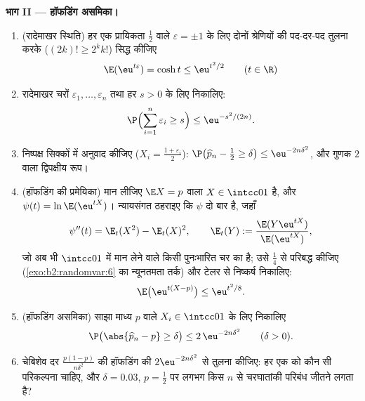 \begin{problem}
\medskip
\noindent\textbf{भाग II --- हॉफडिंग असमिका।}
\begin{enumerate}[resume]
  \item (रादेमाखर स्थिति) हर एक प्रायिकता $\frac12$ वाले $\varepsilon = \pm1$ के लिए
        दोनों श्रेणियों की पद-दर-पद तुलना करके ($(2k)! \geq
        2^kk!$) सिद्ध
        कीजिए
        \[
        \E(\eu^{t\varepsilon}) = \cosh t \leq \eu^{t^2/2}
        \qquad (t \in \R)
        \]
  \item {} रादेमाखर चरों $\varepsilon_1, \dots, \varepsilon_n$ तथा हर $s >
        0$ के लिए निकालिए:
        \[
        \P\Bigl(\sum_{i=1}^n\varepsilon_i \geq s\Bigr)
        \leq \eu^{-s^2/(2n)} .
        \]
  \item निष्पक्ष सिक्कों में अनुवाद कीजिए ($X_i =
        \frac{1+\varepsilon_i}2$): $\P\bigl(\widehat p_n -
        \tfrac12 \geq \delta\bigr) \leq \eu^{-2n\delta^2}$, और गुणक
        $2$ वाला द्विपक्षीय रूप।
  \item (हॉफडिंग की प्रमेयिका) मान लीजिए $\E X =
        p$ वाला $X \in \intcc01$ है, और
        $\psi(t) = \ln\E(\eu^{tX})$। न्यायसंगत ठहराइए कि $\psi$ दो बार  है, जहाँ
        \[
        \psi''(t) = \E_t(X^2) - \E_t(X)^2, \qquad
        \E_t(Y) := \frac{\E(Y\eu^{tX})}{\E(\eu^{tX})},
        \]
        जो अब भी $\intcc01$ में मान लेने वाले किसी पुनःभारित चर का
        \emph{} है; उसे $\frac14$ से परिबद्ध कीजिए (\cref{exo:b2:randomvar:6} का
        न्यूनतमता तर्क) और टेलर से निष्कर्ष निकालिए:
        \[
        \E\bigl(\eu^{t(X - p)}\bigr) \leq \eu^{t^2/8} .
        \]
  \item (हॉफडिंग असमिका) साझा माध्य $p$ वाले  $X_i \in
        \intcc01$ के
        लिए निकालिए
        \[
        \P\bigl(\abs{\widehat p_n - p} \geq \delta\bigr)
        \leq 2\,\eu^{-2n\delta^2}
        \qquad (\delta > 0).
        \]
  \item चेबिशेव दर $\frac{p(1-p)}{n\delta^2}$ की हॉफडिंग की $2\eu^{-2n\delta^2}$ से तुलना कीजिए: हर
        एक को कौन सी परिकल्पना चाहिए, और $\delta = 0.03$, $p =
        \frac12$ पर लगभग
        किस $n$ से चरघातांकी परिबंध जीतने लगता है?
\end{enumerate}


\end{problem}
